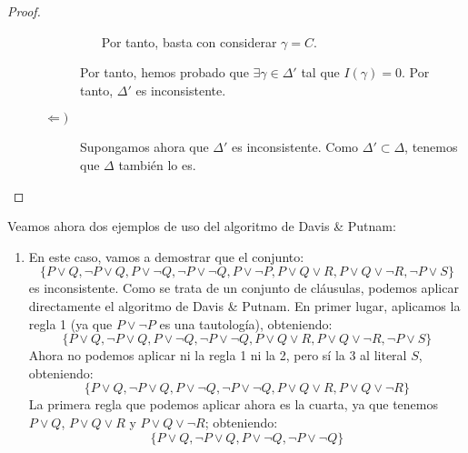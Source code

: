 \begin{teo}
\begin{proof}
\begin{description}
\begin{description}
\begin{itemize}
                        Por tanto, basta con considerar $\gamma=C$.
                    \end{itemize}

                    Por tanto, hemos probado que $\exists \gamma\in \Delta'$ tal que $I(\gamma)=0$. Por tanto, $\Delta'$ es inconsistente.

                    \item[$\Longleftarrow)$] Supongamos ahora que $\Delta'$ es inconsistente. Como $\Delta'\subset \Delta$, tenemos que $\Delta$ también lo es.
                \end{description}
            \end{description}
     \end{proof}
 \end{teo}

 \begin{ejemplo}
     Veamos ahora dos ejemplos de uso del algoritmo de Davis \& Putnam:
     \begin{enumerate}
         \item En este caso, vamos a demostrar que el conjunto:
             \begin{equation*}
                 \{P\lor Q, \lnot P\lor Q, P\lor \lnot Q, \lnot P\lor \lnot Q, P \lor \lnot P, P \lor Q \lor R, P \lor Q \lor \lnot R, \lnot P \lor S\}
             \end{equation*}
             es inconsistente. Como se trata de un conjunto de cláusulas, podemos aplicar directamente el algoritmo de Davis \& Putnam. En primer lugar, aplicamos la regla 1 (ya que $P\lor \lnot P$ es una tautología), obteniendo:
             \begin{equation*}
                 \{P\lor Q, \lnot P\lor Q, P\lor \lnot Q, \lnot P\lor \lnot Q, P \lor Q \lor R, P \lor Q \lor \lnot R, \lnot P \lor S\}
             \end{equation*}
             Ahora no podemos aplicar ni la regla 1 ni la 2, pero sí la 3 al literal $S$, obteniendo:
             \begin{equation*}
                 \{P\lor Q, \lnot P\lor Q, P\lor \lnot Q, \lnot P\lor \lnot Q, P \lor Q \lor R, P \lor Q \lor \lnot R\}
             \end{equation*}
             La primera regla que podemos aplicar ahora es la cuarta, ya que tenemos $P\lor Q$, $P\lor Q\lor R$ y $P\lor Q\lor \lnot R$; obteniendo:
             \begin{equation*}
                 \{P\lor Q, \lnot P\lor Q, P\lor \lnot Q, \lnot P \lor \lnot Q\}

\end{equation*}
\end{enumerate}
\end{ejemplo}
